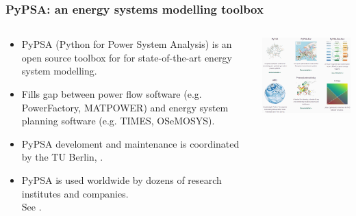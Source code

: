 \begin{frame}
  \frametitle{PyPSA: an energy systems modelling toolbox}

\begin{columns}[T]
\begin{column}{7cm}

{\small
  \begin{itemize}
  \item PyPSA (Python for Power System Analysis) is an open source toolbox 
  for for state-of-the-art energy system modelling.
  \item Fills gap between power flow software (e.g. PowerFactory,
  MATPOWER) and energy system planning software (e.g. TIMES, OSeMOSYS).
  \item PyPSA develoment and maintenance is coordinated by the TU Berlin,
  .  
  \item PyPSA is used worldwide by dozens of research institutes and companies.\\
  See .
  \end{itemize}
}

\end{column}

\begin{column}{9cm}

\centering
\includegraphics[width=8.5cm]{images/pypsa-web.png}

\end{column}
\end{columns}

\end{frame}



